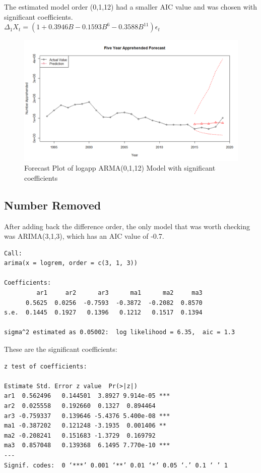 \documentclass[a4paper]{article}
\begin{document}
The estimated model order (0,1,12) had a smaller AIC value and was chosen with significant coefficients. \\

$\Delta_{1}X_t = (1 + 0.3946 B - 0.1593 B^6 - 0.3588 B^{11}) \epsilon_t$\\

\begin{figure}[h!]
\centering
\includegraphics[scale=0.3]{images/NumApp_forecast.png}
\caption{Forecast Plot of logapp ARMA(0,1,12) Model with significant coefficients}
\label{fig:forecast numapp}
\end{figure}

\subsection{Number Removed}
After adding back the difference order, the only model that was worth checking was ARIMA(3,1,3), which has an AIC value of -0.7. \\ 

\begin{verbatim}
Call:
arima(x = logrem, order = c(3, 1, 3))

Coefficients:
         ar1     ar2      ar3      ma1      ma2     ma3
      0.5625  0.0256  -0.7593  -0.3872  -0.2082  0.8570
s.e.  0.1445  0.1927   0.1396   0.1212   0.1517  0.1394

sigma^2 estimated as 0.05002:  log likelihood = 6.35,  aic = 1.3
\end{verbatim}

These are the significant coefficients: \\

\begin{verbatim}
z test of coefficients:

Estimate Std. Error z value  Pr(>|z|)    
ar1  0.562496   0.144501  3.8927 9.914e-05 ***
ar2  0.025558   0.192660  0.1327  0.894464    
ar3 -0.759337   0.139646 -5.4376 5.400e-08 ***
ma1 -0.387202   0.121248 -3.1935  0.001406 ** 
ma2 -0.208241   0.151683 -1.3729  0.169792    
ma3  0.857048   0.139368  6.1495 7.770e-10 ***
---
Signif. codes:  0 ‘***’ 0.001 ‘**’ 0.01 ‘*’ 0.05 ‘.’ 0.1 ‘ ’ 1
\end{verbatim}
\end{document}

